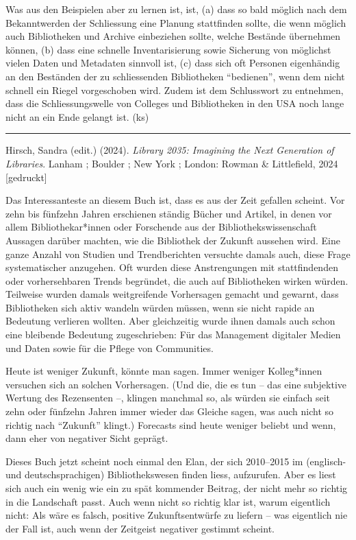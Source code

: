 \documentclass[a4paper,
fontsize=11pt,
oneside,
numbers=noperiodatend,
parskip=half-,
bibliography=totoc,
final
]{scrartcl}
\begin{document}
Was aus den Beispielen aber zu lernen ist, ist, (a) dass so bald möglich
nach dem Bekanntwerden der Schliessung eine Planung stattfinden sollte,
die wenn möglich auch Bibliotheken und Archive einbeziehen sollte,
welche Bestände übernehmen können, (b) dass eine schnelle
Inventarisierung sowie Sicherung von möglichst vielen Daten und
Metadaten sinnvoll ist, (c) dass sich oft Personen eigenhändig an den
Beständen der zu schliessenden Bibliotheken \enquote{bedienen}, wenn dem
nicht schnell ein Riegel vorgeschoben wird. Zudem ist dem Schlusswort zu
entnehmen, dass die Schliessungswelle von Colleges und Bibliotheken in
den USA noch lange nicht an ein Ende gelangt ist. (ks)

\begin{center}\rule{0.5\linewidth}{0.5pt}\end{center}

Hirsch, Sandra (edit.) (2024). \emph{Library 2035: Imagining the Next
Generation of Libraries}. Lanham ; Boulder ; New York ; London: Rowman
\& Littlefield, 2024 {[}gedruckt{]}

Das Interessanteste an diesem Buch ist, dass es aus der Zeit gefallen
scheint. Vor zehn bis fünfzehn Jahren erschienen ständig Bücher und
Artikel, in denen vor allem Bibliothekar*innen oder Forschende aus der
Bibliothekswissenschaft Aussagen darüber machten, wie die Bibliothek der
Zukunft aussehen wird. Eine ganze Anzahl von Studien und Trendberichten
versuchte damals auch, diese Frage systematischer anzugehen. Oft wurden
diese Anstrengungen mit stattfindenden oder vorhersehbaren Trends
begründet, die auch auf Bibliotheken wirken würden. Teilweise wurden
damals weitgreifende Vorhersagen gemacht und gewarnt, dass Bibliotheken
sich aktiv wandeln würden müssen, wenn sie nicht rapide an Bedeutung
verlieren wollten. Aber gleichzeitig wurde ihnen damals auch schon eine
bleibende Bedeutung zugeschrieben: Für das Management digitaler Medien
und Daten sowie für die Pflege von Communities.

Heute ist weniger Zukunft, könnte man sagen. Immer weniger Kolleg*innen
versuchen sich an solchen Vorhersagen. (Und die, die es tun -- das eine
subjektive Wertung des Rezensenten --, klingen manchmal so, als würden
sie einfach seit zehn oder fünfzehn Jahren immer wieder das Gleiche
sagen, was auch nicht so richtig nach \enquote{Zukunft} klingt.)
Forecasts sind heute weniger beliebt und wenn, dann eher von negativer
Sicht geprägt.

Dieses Buch jetzt scheint noch einmal den Elan, der sich 2010--2015 im
(englisch- und deutschsprachigen) Bibliothekswesen finden liess,
aufzurufen. Aber es liest sich auch ein wenig wie ein zu spät kommender
Beitrag, der nicht mehr so richtig in die Landschaft passt. Auch wenn
nicht so richtig klar ist, warum eigentlich nicht: Als wäre es falsch,
positive Zukunftsentwürfe zu liefern -- was eigentlich nie der Fall ist,
auch wenn der Zeitgeist negativer gestimmt scheint.
\end{document}
